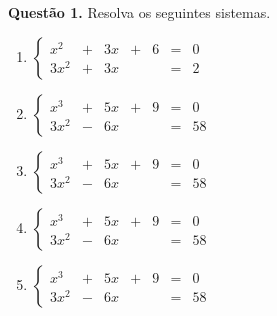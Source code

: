 \documentclass[a4paper]{article}
\begin{document}
\textbf{Questão 1.} Resolva os seguintes sistemas.

\begin{multicols}{2}

\begin{enumerate}[label=\alph*)] %
    \item 
        $
        \left\{
            \begin{array}{rrrrrrr}
                x^2 & + & 3x & + & 6 & = & 0 \\
                3x^2& + & 3x &   &   & = & 2
            \end{array}
        \right.
        $

        \vspace{1cm}

    \item 
        $
        \left\{
            \begin{array}{rrrrrrr}
                x^3 & + & 5x & + & 9 & = & 0 \\
                3x^2& - & 6x &   &   & = & 58
            \end{array}
        \right.
        $

        \vspace{1cm}

        \item 
        $
        \left\{
            \begin{array}{rrrrrrr}
                x^3 & + & 5x & + & 9 & = & 0 \\
                3x^2& - & 6x &   &   & = & 58
            \end{array}
        \right.
        $

        \vspace{1cm}
    
        \item 
        $
        \left\{
            \begin{array}{rrrrrrr}
                x^3 & + & 5x & + & 9 & = & 0 \\
                3x^2& - & 6x &   &   & = & 58
            \end{array}
        \right.
        $

        \vspace{1cm}

        \item 
        $
        \left\{
            \begin{array}{rrrrrrr}
                x^3 & + & 5x & + & 9 & = & 0 \\
                3x^2& - & 6x &   &   & = & 58
            \end{array}
        \right.
        $
\end{enumerate}

\end{multicols}
\end{document}
